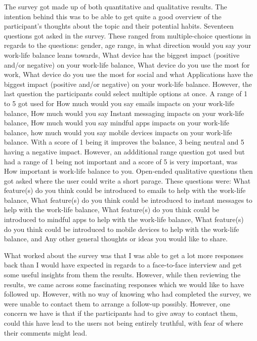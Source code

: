 \documentclass{sigchi}
\begin{document}
	The survey got made up of both quantitative and qualitative results. The intention behind this was to be able to get quite a good overview of the participant's thoughts about the topic and their potential habits. Seventeen questions got asked in the survey. These ranged from multiple-choice questions in regards to the questions: gender, age range, in what direction would you say your work-life balance leans towards, What device has the biggest impact (positive and/or negative) on your work-life balance, What device do you use the most for work, What device do you use the most for social and what Applications have the biggest impact (positive and/or negative) on your work-life balance. However, the last question the participants could select multiple options at once. A range of 1 to 5 got used for How much would you say emails impacts on your work-life balance, How much would you say Instant messaging impacts on your work-life balance, How much would you say mindful apps impacts on your work-life balance, how much would you say mobile devices impacts on your work-life balance. With a score of 1 being it improves the balance, 3 being neutral and 5 having a negative impact. However, an addditional range question got used but had a range of 1 being not important and a score of 5 is very important, was How important is work-life balance to you. Open-ended qualitative questions then got asked where the user could write a short parage. These questions were: What feature(s) do you think could be introduced to emails to help with the work-life balance, What feature(s) do you think could be introduced to instant messages to help with the work-life balance, What feature(s) do you think could be introduced to mindful apps to help with the work-life balance, What feature(s) do you think could be introduced to mobile devices to help with the work-life balance, and Any other general thoughts or ideas you would like to share.
	
	What worked about the survey was that I was able to get a lot more responses back than I would have expected in regards to a face-to-face interview and get some useful insights from them the results. However, while then reviewing the results, we came across some fascinating responses which we would like to have followed up. However, with no way of knowing who had completed the survey, we were unable to contact them to arrange a follow-up possibly. However, one concern we have is that if the participants had to give away to contact them, could this have lead to the users not being entirely truthful, with fear of where their comments might lead.
	
\end{document}
